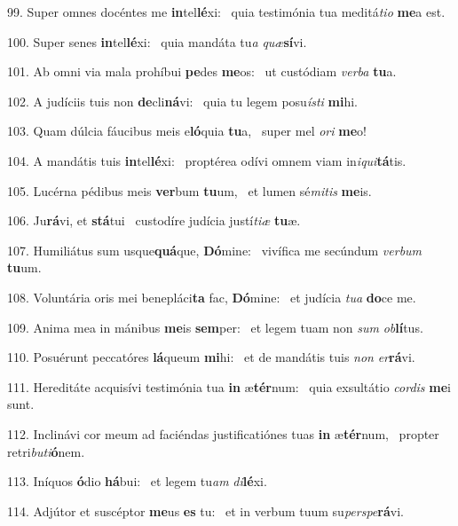 99. Super omnes docéntes me \textbf{in}tel\textbf{lé}xi: \ast\  quia testimónia tua meditá\textit{ti}\textit{o} \textbf{me}a est.\

100. Super senes \textbf{in}tel\textbf{lé}xi: \ast\  quia mandáta tu\textit{a} \textit{quæ}\textbf{sí}vi.\

101. Ab omni via mala prohíbui \textbf{pe}des \textbf{me}os: \ast\  ut custódiam \textit{ver}\textit{ba} \textbf{tu}a.\

102. A judíciis tuis non \textbf{de}cli\textbf{ná}vi: \ast\  quia tu legem posu\textit{ís}\textit{ti} \textbf{mi}hi.\

103. Quam dúlcia fáucibus meis e\textbf{ló}quia \textbf{tu}a, \ast\  super mel \textit{o}\textit{ri} \textbf{me}o!\

104. A mandátis tuis \textbf{in}tel\textbf{lé}xi: \ast\  proptérea odívi omnem viam in\textit{i}\textit{qui}\textbf{tá}tis.\

105. Lucérna pédibus meis \textbf{ver}bum \textbf{tu}um, \ast\  et lumen sé\textit{mi}\textit{tis} \textbf{me}is.\

106. Ju\textbf{rá}vi, et \textbf{stá}tui \ast\  custodíre judícia justí\textit{ti}\textit{æ} \textbf{tu}æ.\

107. Humiliátus sum usque\textbf{quá}que, \textbf{Dó}mine: \ast\  vivífica me secúndum \textit{ver}\textit{bum} \textbf{tu}um.\

108. Voluntária oris mei benepláci\textbf{ta} fac, \textbf{Dó}mine: \ast\  et judícia \textit{tu}\textit{a} \textbf{do}ce me.\

109. Anima mea in mánibus \textbf{me}is \textbf{sem}per: \ast\  et legem tuam non \textit{sum} \textit{ob}\textbf{lí}tus.\

110. Posuérunt peccatóres \textbf{lá}queum \textbf{mi}hi: \ast\  et de mandátis tuis \textit{non} \textit{er}\textbf{rá}vi.\

111. Hereditáte acquisívi testimónia tua \textbf{in} æ\textbf{tér}num: \ast\  quia exsultátio \textit{cor}\textit{dis} \textbf{me}i sunt.\

112. Inclinávi cor meum ad faciéndas justificatiónes tuas \textbf{in} æ\textbf{tér}num, \ast\  propter retri\textit{bu}\textit{ti}\textbf{ó}nem.\

113. Iníquos \textbf{ó}dio \textbf{há}bui: \ast\  et legem tu\textit{am} \textit{di}\textbf{lé}xi.\

114. Adjútor et suscéptor \textbf{me}us \textbf{es} tu: \ast\  et in verbum tuum su\textit{per}\textit{spe}\textbf{rá}vi.\

